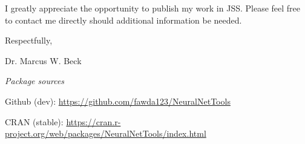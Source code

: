 \documentclass[a4paper,12pt]{article}
\begin{document}
I greatly appreciate the opportunity to publish my work in JSS.  Please feel free to contact me directly should additional information be needed.

\vspace{0.1in}

\hspace{4.5in}Respectfully,

\hspace{4.5in}Dr. Marcus W. Beck

{\it Package sources}

Github (dev): \url{https://github.com/fawda123/NeuralNetTools}

CRAN (stable): \url{https://cran.r-project.org/web/packages/NeuralNetTools/index.html}

\vfill
\end{document}

